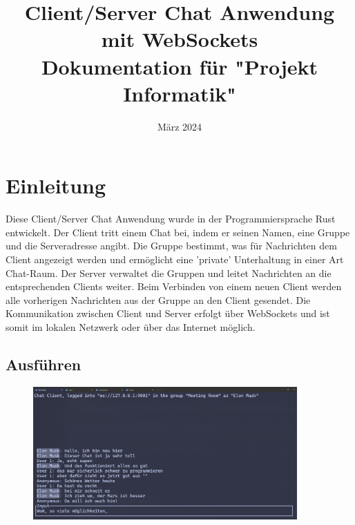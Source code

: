 \documentclass[a4paper]{article}
\title{
\LARGE{Client/Server Chat Anwendung mit WebSockets}  \\ 
\normalsize{Dokumentation für "Projekt Informatik"}
}
\author{}
\date{März 2024}
\begin{document}
\maketitle




\tableofcontents
\newpage


\section{Einleitung}

Diese Client/Server Chat Anwendung wurde in der Programmiersprache Rust entwickelt. Der Client tritt einem Chat bei, indem er seinen Namen, eine Gruppe und die Serveradresse angibt. Die Gruppe bestimmt, was für Nachrichten dem Client angezeigt werden und ermöglicht eine 'private' Unterhaltung in einer Art Chat-Raum. Der Server verwaltet die Gruppen und leitet Nachrichten an die entsprechenden Clients weiter. Beim Verbinden von einem neuen Client werden alle vorherigen Nachrichten aus der Gruppe an den Client gesendet. Die Kommunikation zwischen Client und Server erfolgt über WebSockets und ist somit im lokalen Netzwerk oder über das Internet möglich.



\subsection{Ausführen}

\begin{figure}[H]
    \centering
    \includegraphics[width=0.9\textwidth]{interface.png}
\end{figure}
\end{document}
